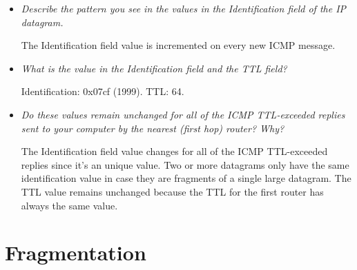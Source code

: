 \documentclass[11pt]{article}
\begin{document}
\begin{itemize}
	\item
		\textit{Describe the pattern you see in the values in the Identification field of the IP datagram.}
		\par The Identification field value is incremented on every new ICMP message.
		
	\item
		\textit{What is the value in the Identification field and the TTL field?}
		\par Identification: 0x07cf (1999).
		\newline TTL: 64.
		
	\item
		\textit{Do these values remain unchanged for all of the ICMP TTL-exceeded replies sent to your
computer by the nearest (first hop) router? Why?}
		\par The Identification field value changes for all of the ICMP TTL-exceeded replies since it's an unique value. Two or more datagrams only have the same identification value in case they are fragments of a single large datagram. The TTL value remains unchanged because the TTL for the first router has always the same value.
	
\end{itemize}

\section{Fragmentation}
\end{document}
